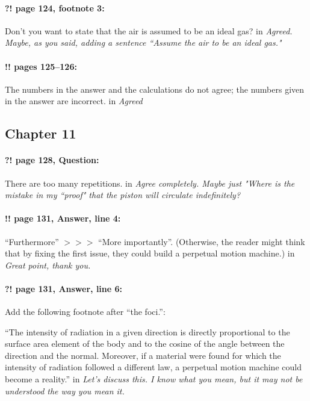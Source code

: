 \documentclass[twoside]{article}
\begin{document}
\paragraph{?! page 124, footnote 3:} Don’t you want to state that the air is assumed to be an ideal gas?
 in {\it  Agreed. Maybe, as you said, adding a sentence ``Assume the air to be an ideal gas."} 

\paragraph{!! pages 125--126:} The numbers in the answer and the calculations do not agree; the numbers given in the answer are incorrect.
 in {\it  Agreed} 


\subsection*{Chapter 11}

\paragraph{?! page 128, Question:} There are too many repetitions.
 in {\it  Agree completely. Maybe just "Where is the mistake in my ``proof" that the piston will circulate indefinitely? } 

\paragraph{!! page 131, Answer, line 4:} ``Furthermore'' $>\!>\!>$ ``More importantly''. (Otherwise, the reader might think that by fixing the first issue, they could build a perpetual motion machine.)
 in {\it  Great point, thank you.} 

\paragraph{?! page 131, Answer, line 6:} Add the following footnote after ``the foci.'':

``The intensity of radiation in a given direction is directly proportional to the surface area element of the body and to the cosine of the angle between the direction and the normal. Moreover, if a material were found for which the intensity of radiation followed a different law, a perpetual motion machine could become a reality.''
 in {\it  Let's discuss this. I know what you mean, but it may not be understood the way you mean it.} 
\end{document}
